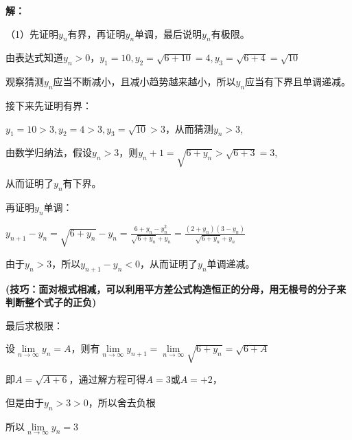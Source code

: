 \documentclass[12pt , a4paper , oneside]{ctexart}
\begin{document}
            \begin{mdframed}
            \textbf{解：}

            （1）先证明$y_n$有界，再证明$y_n$单调，最后说明$y_n$有极限。

            由表达式知道$y_n > 0$，$y_1 = 10 , y_2 = \sqrt{6 + 10} = 4 ,y_3 = \sqrt{6 + 4} = \sqrt{10}$

            观察猜测$y_n$应当不断减小，且减小趋势越来越小，所以$y_n$应当有下界且单调递减。

            接下来先证明有界：

            $y_1 = 10 > 3 ,y_2 = 4 > 3 , y_3 = \sqrt{10} > 3$，从而猜测$y_n > 3$,

            由数学归纳法，假设$y_n > 3$，则$y_n+1 = \sqrt{6+y_n} > \sqrt{6+3} = 3$,

            从而证明了$y_n$有下界。

            再证明$y_n$单调：

            $y_{n+1} - y_n = \sqrt{6+y_n} - y_n = \frac{6+y_n - y_n^2}{\sqrt{6+y_n} + y_n} = \frac{(2+y_n)(3-y_n)}{\sqrt{6+y_n} + y_n}$

            由于$y_n > 3$，所以$y_{n+1} - y_n < 0$，从而证明了$y_n$单调递减。

            \textbf{(技巧：面对根式相减，可以利用平方差公式构造恒正的分母，用无根号的分子来判断整个式子的正负)}

            最后求极限：

            设$\lim\limits_{n \to \infty} y_n = A$，则有$\lim\limits_{n \to \infty} y_{n+1} = \lim\limits_{n \to \infty} \sqrt{6+y_n} = \sqrt{6+A}$

            即$A=\sqrt{A+6}$，通过解方程可得$A=3$或$A=+2$，

            但是由于$y_n > 3 > 0$，所以舍去负根

            所以$\lim\limits_{n \to \infty} y_n = 3$

            \end{mdframed}
\end{document}

